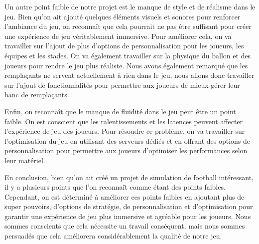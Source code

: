 Un autre point faible de notre projet est le manque de style et de réalisme dans le jeu. Bien qu'on ait ajouté quelques éléments visuels et sonores pour renforcer l'ambiance du jeu, on reconnaît que cela pourrait ne pas être suffisant pour créer une expérience de jeu véritablement immersive. Pour améliorer cela, on va travailler sur l'ajout de plus d'options de personnalisation pour les joueurs, les équipes et les stades. On va également travailler sur la physique du ballon et des joueurs pour rendre le jeu plus réaliste. Nous avons également remarqué que les remplaçants ne servent actuellement à rien dans le jeu, nous allons donc travailler sur l'ajout de fonctionnalités pour permettre aux joueurs de mieux gérer leur banc de remplaçants.

Enfin, on reconnaît que le manque de fluidité dans le jeu peut être un point faible. On est conscient que les ralentissements et les latences peuvent affecter l'expérience de jeu des joueurs. Pour résoudre ce problème, on va travailler sur l'optimisation du jeu en utilisant des serveurs dédiés et en offrant des options de personnalisation pour permettre aux joueurs d'optimiser les performances selon leur matériel.

En conclusion, bien qu'on ait créé un projet de simulation de football intéressant, il y a plusieurs points que l'on reconnaît comme étant des points faibles. Cependant, on est déterminé à améliorer ces points faibles en ajoutant plus de super pouvoirs, d'options de stratégie, de personnalisation et d'optimisation pour garantir une expérience de jeu plus immersive et agréable pour les joueurs. Nous sommes conscients que cela nécessite un travail conséquent, mais nous sommes persuadés que cela améliorera considérablement la qualité de notre jeu.
